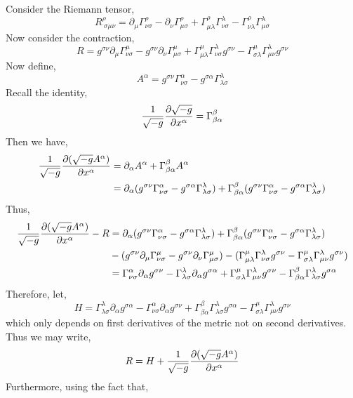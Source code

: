 \documentclass[12pt]{article}
\begin{document}
Consider the Riemann tensor,
\[ R^\rho_{\: \sigma \mu \nu} = \partial_\mu \Gamma^{\rho}_{\nu \sigma} - \partial_\nu \Gamma^\rho_{\mu \sigma} + \Gamma^\rho_{\mu \lambda} \Gamma^\lambda_{\nu \sigma} - \Gamma^\rho_{\nu \lambda} \Gamma^\lambda_{\mu \sigma} \]
Now consider the contraction,
\[ R = g^{\sigma \nu} \partial_\mu \Gamma^\mu_{\nu \sigma} - g^{\sigma \nu} \partial_\nu \Gamma^\mu_{\mu \sigma} + \Gamma^\mu_{\mu \lambda} \Gamma^{\lambda}_{\nu \sigma} g^{\sigma \nu} - \Gamma^\mu_{\sigma \lambda} \Gamma^\lambda_{\mu \nu} g^{\sigma \nu} \] 
Now define,
\[ A^\alpha = g^{\sigma \nu} \Gamma^\alpha_{\nu \sigma} - g^{\sigma \alpha} \Gamma^\lambda_{\lambda \sigma} \]
Recall the identity,
\[ \frac{1}{\sqrt{-g}} \frac{\partial{\sqrt{-g}}}{\partial{x^\alpha}}  = \Gamma^\beta_{\beta \alpha}  \]
Then we have,
\begin{align*}
\frac{1}{\sqrt{-g}} \frac{\partial{(\sqrt{-g} A^\alpha)}}{\partial{x^\alpha}} & = \partial_\alpha A^\alpha + \Gamma^\beta_{\beta \alpha} A^\alpha 
\\
& = \partial_\alpha (g^{\sigma \nu} \Gamma^\alpha_{\nu \sigma} - g^{\sigma \alpha} \Gamma^\lambda_{\lambda \sigma}) + \Gamma^{\beta}_{\beta \alpha} (g^{\sigma \nu} \Gamma^\alpha_{\nu \sigma} - g^{\sigma \alpha} \Gamma^\lambda_{\lambda \sigma}) 
\end{align*}
Thus,
\begin{align*}
\frac{1}{\sqrt{-g}} \frac{\partial{(\sqrt{-g} A^\alpha)}}{\partial{x^\alpha}} - R  & = \partial_\alpha (g^{\sigma \nu} \Gamma^\alpha_{\nu \sigma} - g^{\sigma \alpha} \Gamma^\lambda_{\lambda \sigma}) + \Gamma^{\beta}_{\beta \alpha} (g^{\sigma \nu} \Gamma^\alpha_{\nu \sigma} - g^{\sigma \alpha} \Gamma^\lambda_{\lambda \sigma})
\\
& - (g^{\sigma \nu} \partial_\mu \Gamma^\mu_{\nu \sigma} - g^{\sigma \nu} \partial_\nu \Gamma^\mu_{\mu \sigma}) - (\Gamma^\mu_{\mu \lambda} \Gamma^{\lambda}_{\nu \sigma} g^{\sigma \nu} - \Gamma^\mu_{\sigma \lambda} \Gamma^\lambda_{\mu \nu} g^{\sigma \nu})
\\
& = \Gamma^{\alpha}_{\nu \sigma} \partial_\alpha g^{\sigma \nu} - \Gamma^{\lambda}_{\lambda \sigma} \partial_\alpha g^{\sigma \alpha} + \Gamma^\mu_{\sigma \lambda} \Gamma^\lambda_{\mu \nu} g^{\sigma \nu} - \Gamma^{\beta}_{\beta \alpha}  \Gamma^\lambda_{\lambda \sigma} g^{\sigma \alpha}
\end{align*}
Therefore, let,
\[ H = \Gamma^{\lambda}_{\lambda \sigma} \partial_\alpha g^{\sigma \alpha} - \Gamma^{\alpha}_{\nu \sigma} \partial_\alpha g^{\sigma \nu}   +  \Gamma^{\beta}_{\beta \alpha} \Gamma^\lambda_{\lambda \sigma} g^{\sigma \alpha} - \Gamma^\mu_{\sigma \lambda} \Gamma^\lambda_{\mu \nu} g^{\sigma \nu}\]
which only depends on first derivatives of the metric not on second derivatives. Thus we may write,
\[ R = H +  \frac{1}{\sqrt{-g}} \frac{\partial{(\sqrt{-g} A^\alpha)}}{\partial{x^\alpha}} \]
Furthermore, using the fact that,
\end{document}
